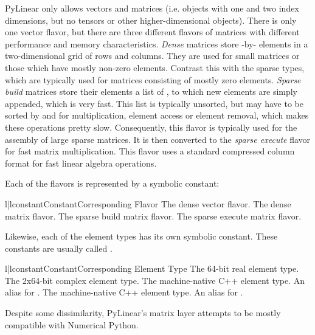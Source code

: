 PyLinear only allows vectors and matrices (i.e.  objects with one and
two index dimensions, but no tensors or other higher-dimensional
objects). There is only one vector flavor, but there are three
different flavors of matrices with different performance and memory
characteristics. \emph{Dense} matrices store -by-
elements in a two-dimensional grid of  rows and 
columns. They are used for small matrices or those which have mostly
non-zero elements. Contrast this with the sparse types, which are
typically used for matrices consisting of mostly zero
elements. \emph{Sparse build} matrices store their elements a list of
, to which new elements are simply appended,
which is very fast. This list is typically unsorted, but may have to
be sorted by  and  for multiplication, element access or
element removal, which makes these operations pretty
slow. Consequently, this flavor is typically used for the assembly of
large sparse matrices. It is then converted to the \emph{sparse
execute} flavor for fast matrix multiplication. This flavor uses a
standard compressed column format for fast linear algebra operations.

Each of the flavors is represented by a symbolic constant:

\begin{tableii}{l|l}{constant}{Constant}{Corresponding Flavor}
         {The dense vector flavor.}
         {The dense matrix flavor.}
         {The sparse build matrix flavor.}
         {The sparse execute matrix flavor.}
\end{tableii}

Likewise, each of the element types has its own symbolic constant.
These constants are usually called .

\begin{tableii}{l|l}{constant}{Constant}{Corresponding Element Type}
         {The 64-bit real element type.}
         {The 2x64-bit complex element type.}
         {The machine-native C++  element type.
          An alias for .}
         {The machine-native C++  
          element type. An alias for .}
\end{tableii}

Despite some dissimilarity, PyLinear's matrix layer attempts to be
mostly compatible with Numerical Python.

